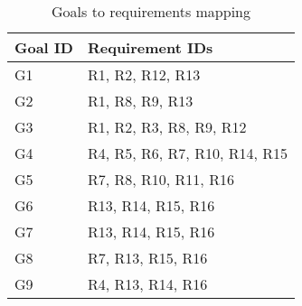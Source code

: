 \documentclass[../../main.tex]{subfiles}
\begin{document}
    {
    \begin{table}[H]
      \centering
      \begin{tabular}{|l|l|}
        \hline
        \textbf{Goal ID} & \textbf{Requirement IDs}\\ \hline\hline
        G1 & R1, R2, R12, R13 \\
        G2 & R1, R8, R9, R13 \\
        G3 & R1, R2, R3, R8, R9, R12\\
        G4 & R4, R5, R6, R7, R10, R14, R15\\
        G5 & R7, R8, R10, R11, R16\\
        G6 & R13, R14, R15, R16\\
        G7 & R13, R14, R15, R16\\
        G8 & R7, R13, R15, R16\\
        G9 & R4, R13, R14, R16\\
        \hline
      \end{tabular}
      \caption{Goals to requirements mapping}
      \end{table}
    }
\end{document}
